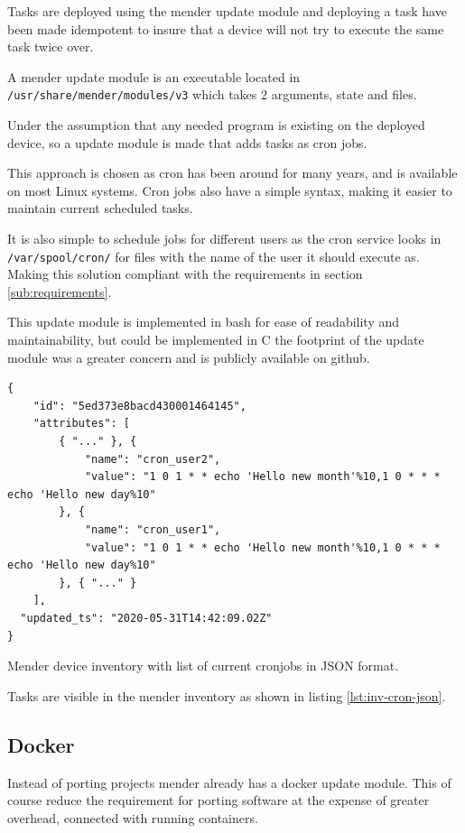 \documentclass[../../main.tex]{subfiles}
\begin{document}
Tasks are deployed using the mender update module and deploying a task have been made idempotent
to insure that a device will not try to execute the same task twice over.

A mender update module is an executable located in \texttt{/usr/share/mender/modules/v3}
which takes 2 arguments, state and files.

Under the assumption that any needed program is existing on the deployed device,
so a update module is made that adds tasks as cron jobs.

This approach is chosen as cron has been around for many years, and is available on most
Linux systems.
Cron jobs also have a simple syntax, making it easier to maintain current scheduled tasks.

It is also simple to schedule jobs for different users as the cron service looks in
\texttt{/var/spool/cron/} for files with the name of the user it should execute as.
Making this solution compliant with the requirements in section \ref{sub:requirements}.

This update module is implemented in bash for ease of readability and maintainability, but could
be implemented in C the footprint of the update module was a greater concern and is publicly
available on github\cite{mclurs-update-module}.



\begin{listing}[h]
\begin{verbatim}
{
	"id": "5ed373e8bacd430001464145",
	"attributes": [
		{ "..." }, {
			"name": "cron_user2",
			"value": "1 0 1 * * echo 'Hello new month'%10,1 0 * * * echo 'Hello new day%10"
		}, {
			"name": "cron_user1",
			"value": "1 0 1 * * echo 'Hello new month'%10,1 0 * * * echo 'Hello new day%10"
		}, { "..." }
	],
  "updated_ts": "2020-05-31T14:42:09.02Z"
}
\end{verbatim}
\caption{Mender device inventory with list of current cronjobs in JSON format.}
\label{lst:inv-cron-json}
\end{listing}

Tasks are visible in the mender inventory as shown in listing \ref{lst:inv-cron-json}.


\subsection{Docker}%
\label{sub:docker}

Instead of porting projects mender already has a docker update module. This of course reduce
the requirement for porting software at the expense of greater overhead, connected with running
containers.
\end{document}
